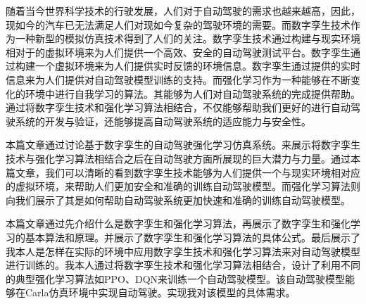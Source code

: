 \begin{abstractzh}
随着当今世界科学技术的行驶发展，人们对于自动驾驶的需求也越来越高，因此，现如今的汽车已无法满足人们对现如今复杂的驾驶环境的需要。而数字孪生技术作为一种新型的模拟仿真技术得到了人们的关注。数字孪生技术通过构建与现实环境相对于的虚拟环境来为人们提供一个高效、安全的自动驾驶测试平台。数字孪生通过构建一个虚拟环境来为人们提供实时反馈的环境信息。数字孪生通过提供的实时信息来为人们提供对自动驾驶模型训练的支持。而强化学习作为一种能够在不断变化的环境中进行自我学习的算法。其能够为人们对自动驾驶系统的完成提供帮助。通过将数字孪生技术和强化学习算法相结合，不仅能够帮助我们更好的进行自动驾驶系统的开发与验证，还能够提高自动驾驶系统的适应能力与安全性。

本篇文章通过讨论基于数字孪生的自动驾驶强化学习仿真系统。来展示将数字孪生技术与强化学习算法相结合之后在自动驾驶方面所展现的巨大潜力与力量。通过本篇文章，我们可以清晰的看到数字孪生技术能够为人们提供一个与现实环境相对应的虚拟环境，来帮助人们更加安全和准确的训练自动驾驶模型。而强化学习算法则向我们展示了其是如何帮助自动驾驶系统更加快速和准确的训练自动驾驶模型。

本篇文章通过先介绍什么是数字孪生和强化学习算法，再展示了数字孪生和强化学习的基本算法和原理。并展示了数字孪生和强化学习算法的具体公式。最后展示了我本人是怎样在实际的环境中应用数字孪生技术和强化学习算法来对自动驾驶模型进行训练的。我本人通过将数字孪生技术和强化学习算法相结合，设计了利用不同的典型强化学习算法如PPO、DQN来训练一个自动驾驶模型。该自动驾驶模型能够在Carla仿真环境中实现自动驾驶。实现我对该模型的具体需求。


\end{abstractzh}